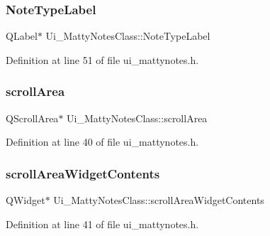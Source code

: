 \hypertarget{classUi__MattyNotesClass_a48fa5329cbef0c993de74749b395e26f}{}\label{classUi__MattyNotesClass_a48fa5329cbef0c993de74749b395e26f} 
\subsubsection{\texorpdfstring{Note\+Type\+Label}{NoteTypeLabel}}
{\footnotesize\ttfamily Q\+Label$\ast$ Ui\+\_\+\+Matty\+Notes\+Class\+::\+Note\+Type\+Label}



Definition at line 51 of file ui\+\_\+mattynotes.\+h.

\hypertarget{classUi__MattyNotesClass_ae86843a493941b949a4ab67b1b85c2cf}{}\label{classUi__MattyNotesClass_ae86843a493941b949a4ab67b1b85c2cf} 
\subsubsection{\texorpdfstring{scroll\+Area}{scrollArea}}
{\footnotesize\ttfamily Q\+Scroll\+Area$\ast$ Ui\+\_\+\+Matty\+Notes\+Class\+::scroll\+Area}



Definition at line 40 of file ui\+\_\+mattynotes.\+h.

\hypertarget{classUi__MattyNotesClass_ab89cebba84d5ea3e808da6d0db9d673c}{}\label{classUi__MattyNotesClass_ab89cebba84d5ea3e808da6d0db9d673c} 
\subsubsection{\texorpdfstring{scroll\+Area\+Widget\+Contents}{scrollAreaWidgetContents}}
{\footnotesize\ttfamily Q\+Widget$\ast$ Ui\+\_\+\+Matty\+Notes\+Class\+::scroll\+Area\+Widget\+Contents}



Definition at line 41 of file ui\+\_\+mattynotes.\+h.


